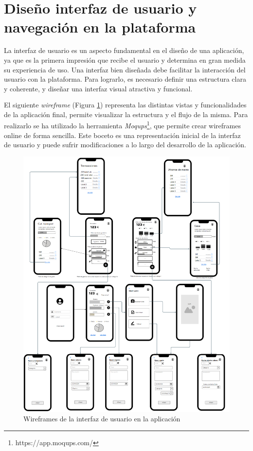 \section{Diseño interfaz de usuario y navegación en la plataforma}
\label{sec:diseno_interfaz_usuario}
La interfaz de usuario es un aspecto fundamental en el diseño de una aplicación, ya que es la primera impresión que recibe el usuario y determina en gran medida su experiencia de uso. Una interfaz bien diseñada debe facilitar la interacción del usuario con la plataforma. Para lograrlo, es necesario definir una estructura clara y coherente, y diseñar una interfaz visual atractiva y funcional.

El siguiente \textit{wireframe} (Figura \ref{fig:wireframes_vistas}) representa las distintas vistas y funcionalidades de la aplicación final, permite visualizar la estructura y el flujo de la misma. Para realizarlo se ha utilizado la herramienta \textit{Moqups}\footnote{https://app.moqups.com/}, que permite crear wireframes online de forma sencilla. Este boceto es una representación inicial de la interfaz de usuario y puede sufrir modificaciones a lo largo del desarrollo de la aplicación.

\begin{figure}[ht!]
    \centering
    \includegraphics[width=\linewidth]{imagenes/wireframe.moqups.png}
    \caption{Wireframes de la interfaz de usuario en la aplicación}
    \label{fig:wireframes_vistas}
\end{figure}

